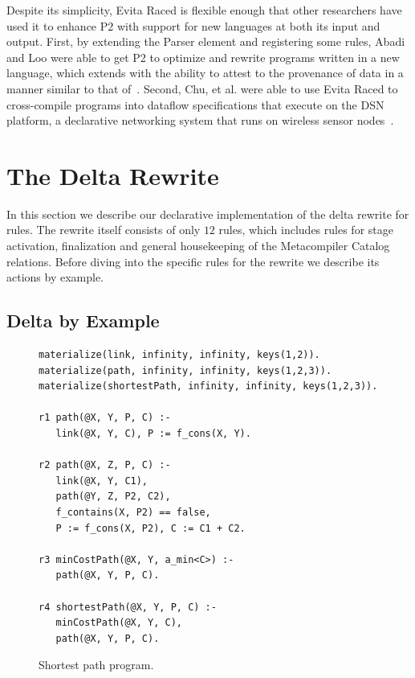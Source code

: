 Despite its simplicity, Evita Raced is flexible enough that other researchers
have used it to enhance P2 with support for new languages at both its input and
output.  First, by extending the Parser element and registering some \OVERLOG
rules, Abadi and Loo were able to get P2 to optimize and rewrite programs
written in a new language, which extends \OVERLOG with the ability to attest to
the provenance of data in a manner similar to that of~\cite{abadi-netdb07}.
Second, Chu, et al. were able to use Evita Raced to cross-compile \OVERLOG programs
into dataflow specifications that execute on the DSN platform, a declarative
networking system that runs on wireless sensor nodes~\cite{chu-sensys07}.


\section{The Delta Rewrite}
\label{ch:evita:sec:delta}

In this section we describe our declarative implementation of the delta rewrite
for \OVERLOG rules.  The rewrite itself consists of only $12$ rules, which
includes rules for stage activation, finalization and general housekeeping of
the Metacompiler Catalog relations.  Before diving into the specific rules for
the rewrite we describe its actions by example.

\subsection{Delta by Example}

\begin{figure}[!t]
\ssp
\centering
\begin{lstlisting}
materialize(link, infinity, infinity, keys(1,2)).
materialize(path, infinity, infinity, keys(1,2,3)).
materialize(shortestPath, infinity, infinity, keys(1,2,3)).
  
r1 path(@X, Y, P, C) :- 
   link(@X, Y, C), P := f_cons(X, Y).

r2 path(@X, Z, P, C) :-
   link(@X, Y, C1), 
   path(@Y, Z, P2, C2),
   f_contains(X, P2) == false,
   P := f_cons(X, P2), C := C1 + C2.

r3 minCostPath(@X, Y, a_min<C>) :-
   path(@X, Y, P, C).

r4 shortestPath(@X, Y, P, C) :-
   minCostPath(@X, Y, C), 
   path(@X, Y, P, C).

\end{lstlisting}
\caption{\label{ch:evita:fig:basicSP}Shortest path program.}
\end{figure}

